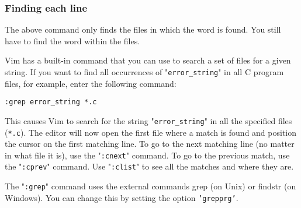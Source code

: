 \subsubsection{Finding each line}
The above command only finds the files in which the word is found.
You still have to find the word within the files.

Vim has a built-in command that you can use to search a set of files for a given string.
If you want to find all occurrences of "\texttt{error\_string}" in all C program files, for example, enter the following command:

\begin{Verbatim}[samepage=true]
 :grep error_string *.c
\end{Verbatim}

This causes Vim to search for the string "\texttt{error\_string}" in all the specified files (\texttt{*.c}).
The editor will now open the first file where a match is found and position the cursor on the first matching line.
To go to the next matching line (no matter in what file it is), use the "\texttt{:cnext}" command.
To go to the previous match, use the "\texttt{:cprev}" command.
Use "\texttt{:clist}" to see all the matches and where they are.

The "\texttt{:grep}" command uses the external commands grep (on Unix) or findstr (on Windows).
You can change this by setting the option \texttt{'grepprg'}.
\clearpage
